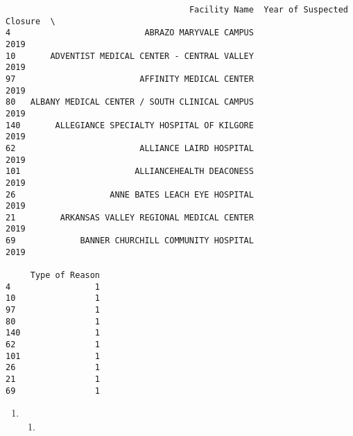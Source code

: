 \documentclass[
  letterpaper,
  DIV=11,
  numbers=noendperiod]{scrartcl}
\providecommand{\tightlist}{%
  \setlength{\itemsep}{0pt}\setlength{\parskip}{0pt}}\usepackage{longtable,booktabs,array}
\begin{document}
\begin{verbatim}
                                     Facility Name  Year of Suspected Closure  \
4                           ABRAZO MARYVALE CAMPUS                       2019   
10       ADVENTIST MEDICAL CENTER - CENTRAL VALLEY                       2019   
97                         AFFINITY MEDICAL CENTER                       2019   
80   ALBANY MEDICAL CENTER / SOUTH CLINICAL CAMPUS                       2019   
140       ALLEGIANCE SPECIALTY HOSPITAL OF KILGORE                       2019   
62                         ALLIANCE LAIRD HOSPITAL                       2019   
101                       ALLIANCEHEALTH DEACONESS                       2019   
26                   ANNE BATES LEACH EYE HOSPITAL                       2019   
21         ARKANSAS VALLEY REGIONAL MEDICAL CENTER                       2019   
69             BANNER CHURCHILL COMMUNITY HOSPITAL                       2019   

     Type of Reason  
4                 1  
10                1  
97                1  
80                1  
140               1  
62                1  
101               1  
26                1  
21                1  
69                1  
\end{verbatim}

\begin{enumerate}
\def\labelenumi{\arabic{enumi}.}
\setcounter{enumi}{2}
\tightlist
\item
  \begin{enumerate}
  \def\labelenumii{\alph{enumii}.}
  \tightlist
  \item
  \end{enumerate}
\end{enumerate}
\end{document}
